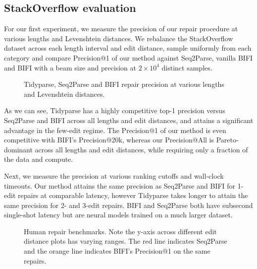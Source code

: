 \documentclass[runningheads]{llncs}
\begin{document}

\subsection{StackOverflow evaluation}\label{sec:rq2}

For our first experiment, we measure the precision of our repair procedure at various lengths and Levenshtein distances. We rebalance the StackOverflow dataset across each length interval and edit distance, sample uniformly from each category and compare Precision@1 of our method against Seq2Parse, vanilla BIFI and BIFI with a beam size and precision at $2\times10^4$ distinct samples.

\begin{figure}[h!]
  \resizebox{.24\textwidth}{!}{}
  \resizebox{.24\textwidth}{!}{}
  \resizebox{.24\textwidth}{!}{}
  \resizebox{.24\textwidth}{!}{}
  \caption{Tidyparse, Seq2Parse and BIFI repair precision at various lengths and Levenshtein distances.}\label{fig:len_dist_prec}
\end{figure}

As we can see, Tidyparse has a highly competitive top-1 precision versus Seq2Parse and BIFI across all lengths and edit distances, and attains a significant advantage in the few-edit regime. The Precision@1 of our method is even competitive with BIFI's Precision@20k, whereas our Precision@All is Pareto-dominant across all lengths and edit distances, while requiring only a fraction of the data and compute.

Next, we measure the precision at various ranking cutoffs and wall-clock timeouts. Our method attains the same precision as Seq2Parse and BIFI for 1-edit repairs at comparable latency, however Tidyparse takes longer to attain the same precision for 2- and 3-edit repairs. BIFI and Seq2Parse both have subsecond single-shot latency but are neural models trained on a much larger dataset.

\begin{figure}[h!]
  \resizebox{.24\textwidth}{!}{}
  \resizebox{.24\textwidth}{!}{}
  \resizebox{.24\textwidth}{!}{}
  \resizebox{.24\textwidth}{!}{}
  \caption{Human repair benchmarks. Note the y-axis across different edit distance plots has varying ranges. The red line indicates Seq2Parse and the orange line indicates BIFI's Precision@1 on the same repairs.}\label{fig:human}
\end{figure}
\end{document}
